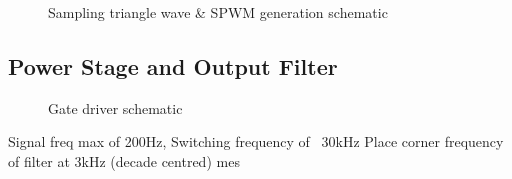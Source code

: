 \documentclass[11pt]{article}
\begin{document}
{\begin{figure}[h!]
  \centering
  \caption{Sampling triangle wave \& SPWM generation schematic}
  \label{F:sample_schem}
\end{figure}

\subsection{Power Stage and Output Filter}

\begin{figure}[h!]
  \centering
  \caption{Gate driver schematic}
  \label{F:gate_drive_schem}
\end{figure}



Signal freq max of 200Hz, Switching frequency of ~30kHz
Place corner frequency of filter at 3kHz (decade centred)
mes


}
\end{document}
